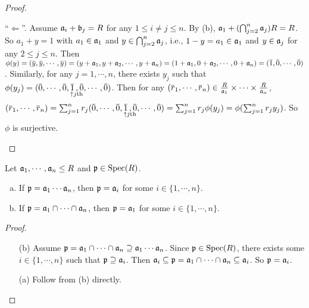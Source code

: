 \begin{proof}
\begin{enumerate}
            ``$\Leftarrow$''. Assume $\mathfrak{a}_i + \mathfrak{b}_j = R$ for any $1 \leq i \neq j \leq n$. By (b), $\mathfrak{a}_1 + (\bigcap_{j=2}^n \mathfrak{a}_j)R = R$. So $a_1 + y = 1$ with $a_1 \in \mathfrak{a}_1$ and $y \in \bigcap_{j=2}^n \mathfrak{a}_j$, i.e., $1-y = a_1 \in \mathfrak{a}_1$ and $y \in \mathfrak{a}_j$ for any $2 \leq j \leq n$. Then $\phi(y) = (\overbar y, \overbar y, \cdots, \overbar y) = (y + \ffa_1, y + \ffa_2, \cdots, y + \ffa_n) = (1+\ffa_1,0+\ffa_2,\cdots,0+\ffa_n) = (\overbar 1,\overbar 0, \cdots, \overbar 0)$. Similarly, for any $j = 1,\cdots,n$, there exists $y_j$ such that $\phi(y_j) = (\overbar 0, \cdots, \overbar 0, \mathpunct{\underset{\mathclap{\substack{\ \ \ \uparrow j\text{th}\\ \textstyle }}}{\overbar 1}}, \overbar 0, \cdots, \overbar 0)$. Then for any $(\overbar r_1,\cdots, \overbar r_n) \in \frac{R}{\ffa_1} \times \cdots \times \frac{R}{\ffa_n}$, $(\overbar r_1,\cdots, \overbar r_n) = \sum_{j=1}^n r_j(\overbar 0, \cdots, \overbar 0, \mathpunct{\underset{\mathclap{\substack{\ \ \ \uparrow j\text{th} \\ \textstyle }}}{\overbar 1}}, \overbar 0, \cdots, \overbar 0) = \sum_{j=1}^n r_j\phi(y_j) = \phi(\sum_{j=1}^nr_jy_j)$. So $\phi$ is surjective.
    \end{enumerate}
\end{proof}


\begin{proposition}
    Let $\mathfrak{a}_1,\cdots,\mathfrak{a}_n \leq R$ and $\mathfrak{p} \in \operatorname{Spec}(R)$.
    \begin{enumerate}[(a)]
        \item If $\mathfrak{p} = \mathfrak{a}_1 \cdots \mathfrak{a}_n$, then $\mathfrak{p} = \mathfrak{a}_i$ for some $i \in \{1,\cdots,n\}$.
        \item If $\mathfrak{p} = \mathfrak{a}_1 \cap \cdots \cap \mathfrak{a}_n$, then $\mathfrak{p} = \mathfrak{a}_1$ for some $i \in \{1,\cdots,n\}$.
    \end{enumerate}
\end{proposition}

\begin{proof}
    \begin{enumerate}
        \item [(b)] Assume $\mathfrak{p} = \mathfrak{a}_1 \cap \cdots \cap \mathfrak{a}_n \supseteq \mathfrak{a}_1 \cdots \mathfrak{a}_n$. Since $\mathfrak{p} \in \operatorname{Spec}(R)$, there exists some $i \in \{1,\cdots,n\}$ such that $\mathfrak{p} \supseteq \mathfrak{a}_i$. Then $\mathfrak{a}_i \subseteq \mathfrak{p} = \mathfrak{a}_1 \cap \cdots \cap \mathfrak{a}_n \subseteq \mathfrak{a}_i$. So $\mathfrak{p} = \mathfrak{a}_i$. 
        \item[(a)] Follow from (b) directly.
    \end{enumerate}
\end{proof}

